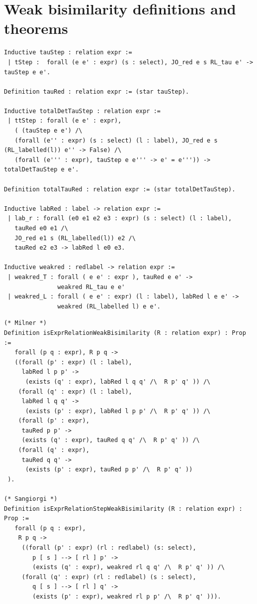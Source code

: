 \documentclass[12pt,twoside,notitlepage]{report}
\theoremstyle{plain}%
\theoremstyle{definition}
\theoremstyle{remark}
\begin{document}
\section{Weak bisimilarity definitions and theorems}
\begin{minipage}{\linewidth}
\begin{lstlisting}[language={Coq}, caption={Definitions of reduction relations}, numbersep=11pt]
Inductive tauStep : relation expr :=
 | tStep :  forall (e e' : expr) (s : select), JO_red e s RL_tau e' -> tauStep e e'.

Definition tauRed : relation expr := (star tauStep).

Inductive totalDetTauStep : relation expr :=
 | ttStep : forall (e e' : expr),
   ( (tauStep e e') /\ 
   (forall (e'' : expr) (s : select) (l : label), JO_red e s (RL_labelled(l)) e'' -> False) /\ 
   (forall (e''' : expr), tauStep e e''' -> e' = e''')) -> totalDetTauStep e e'.
 
Definition totalTauRed : relation expr := (star totalDetTauStep).

Inductive labRed : label -> relation expr :=
 | lab_r : forall (e0 e1 e2 e3 : expr) (s : select) (l : label),
   tauRed e0 e1 /\
   JO_red e1 s (RL_labelled(l)) e2 /\
   tauRed e2 e3 -> labRed l e0 e3.
   
Inductive weakred : redlabel -> relation expr :=
 | weakred_T : forall ( e e' : expr ), tauRed e e' -> 
               weakred RL_tau e e'
 | weakred_L : forall ( e e' : expr) (l : label), labRed l e e' -> 
               weakred (RL_labelled l) e e'.               
\end{lstlisting}
\end{minipage}
\begin{minipage}{\linewidth}
\begin{lstlisting}[language={Coq}, caption={Definitions of weak bisimilarity},numbersep=11pt]
(* Milner *)
Definition isExprRelationWeakBisimilarity (R : relation expr) : Prop :=
   forall (p q : expr), R p q -> 
   ((forall (p' : expr) (l : label), 
     labRed l p p' ->
      (exists (q' : expr), labRed l q q' /\  R p' q' )) /\
    (forall (q' : expr) (l : label),
     labRed l q q' ->
      (exists (p' : expr), labRed l p p' /\  R p' q' )) /\ 
    (forall (p' : expr),
     tauRed p p' -> 
     (exists (q' : expr), tauRed q q' /\  R p' q' )) /\
    (forall (q' : expr), 
     tauRed q q' ->
      (exists (p' : expr), tauRed p p' /\  R p' q' ))
 ).

(* Sangiorgi *)
Definition isExprRelationStepWeakBisimilarity (R : relation expr) : Prop :=
   forall (p q : expr),
    R p q -> 
     ((forall (p' : expr) (rl : redlabel) (s: select),
        p [ s ] --> [ rl ] p' -> 
        (exists (q' : expr), weakred rl q q' /\  R p' q' )) /\
     (forall (q' : expr) (rl : redlabel) (s : select),
        q [ s ] --> [ rl ] q' ->
        (exists (p' : expr), weakred rl p p' /\  R p' q' ))).            
\end{lstlisting}
\end{minipage}
\end{document}
